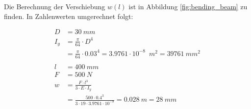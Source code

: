 		\begin{Figure}
			\centering
			\label{fig:bending_beam}
			\vspace*{0.5mm}
		\end{Figure}
	
		Die Berechnung der Verschiebung $w\left(l\right)$ ist in Abbildung \ref{fig:bending_beam} zu finden.
		In Zahlenwerten umgerechnet folgt:

		\begin{mycapequ}[!ht]
			\vspace{-10mm}
			\begin{align*}
				D   &= \SI{30}{mm} \\
				I_y &= \frac{\pi}{64} \cdot D^4 \\
				    &= \frac{\pi}{64} \cdot 0.03^4 = 3.9761 \cdot 10^{-8} \; \SI{}{m^2} = \SI{39761}{mm^2} \\
				\\
				l   &= \SI{400}{mm} \\
				F   &= \SI{500}{N} \\
				w   &= \frac{F \cdot l^3}{3 \cdot E \cdot I_y} \\
				    &= \frac{500 \cdot 0.4^3}{3 \cdot 19 \cdot 3.9761 \cdot 10^{-8}} = \SI{0.028}{m} = \SI{28}{mm}
			\end{align*}
		\end{mycapequ}
	
